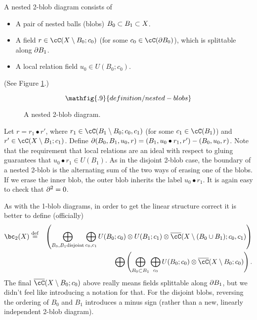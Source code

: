 A nested 2-blob diagram consists of
\begin{itemize}
\item A pair of nested balls (blobs) $B_0 \subset B_1 \subset X$.
\item A field $r \in \cC(X \setmin B_0; c_0)$
(for some $c_0 \in \cC(\bd B_0)$), which is splittable along $\partial B_1$.
\item A local relation field $u_0 \in U(B_0; c_0)$.
\end{itemize}
(See Figure \ref{blob2ndiagram}.)
\begin{figure}[!ht]\begin{equation*}
\mathfig{.9}{definition/nested-blobs}
\end{equation*}\caption{A nested 2-blob diagram.}\label{blob2ndiagram}\end{figure}
Let $r = r_1 \bullet r'$, where $r_1 \in \cC(B_1 \setmin B_0; c_0, c_1)$
(for some $c_1 \in \cC(B_1)$) and
$r' \in \cC(X \setmin B_1; c_1)$.
Define $\partial(B_0, B_1, u_0, r) = (B_1, u_0\bullet r_1, r') - (B_0, u_0, r)$.
Note that the requirement that
local relations are an ideal with respect to gluing guarantees that $u_0\bullet r_1 \in U(B_1)$.
As in the disjoint 2-blob case, the boundary of a nested 2-blob is the alternating
sum of the two ways of erasing one of the blobs.
If we erase the inner blob, the outer blob inherits the label $u_0\bullet r_1$.
It is again easy to check that $\partial^2 = 0$.

As with the 1-blob diagrams, in order to get the linear structure correct it is better to define
(officially)
\begin{eqnarray*}
	\bc_2(X) & \deq &
	\left( 
		\bigoplus_{B_0, B_1 \text{disjoint}} \bigoplus_{c_0, c_1}
			U(B_0; c_0) \otimes U(B_1; c_1) \otimes \lf(X\setmin (B_0\cup B_1); c_0, c_1)
	\right) \\
	&& \bigoplus \left( 
		\bigoplus_{B_0 \subset B_1} \bigoplus_{c_0}
			U(B_0; c_0) \otimes \lf(X\setmin B_0; c_0)
	\right) .
\end{eqnarray*}
The final $\lf(X\setmin B_0; c_0)$ above really means fields splittable along $\partial B_1$,
but we didn't feel like introducing a notation for that.
For the disjoint blobs, reversing the ordering of $B_0$ and $B_1$ introduces a minus sign
(rather than a new, linearly independent 2-blob diagram).

